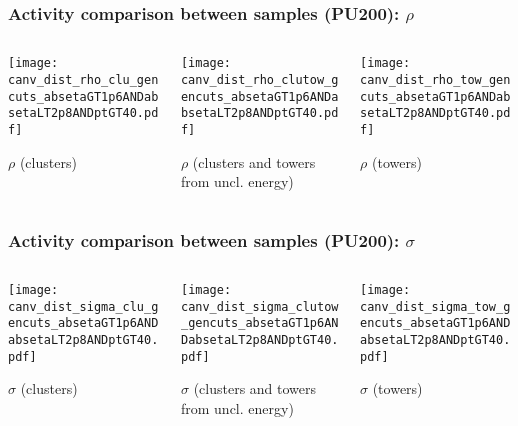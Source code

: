 \documentclass[8pt]{beamer}
\begin{document}
\begin{frame}
 \frametitle{Activity comparison between samples (PU200): $\rho$}
 
 \begin{columns}
  \begin{column}{0.4\textwidth}
   \texttt{[image: canv\_dist\_rho\_clu\_gencuts\_absetaGT1p6ANDabsetaLT2p8ANDptGT40.pdf]}
   
   $\rho$ (clusters)
  \end{column}
  \begin{column}{0.4\textwidth}
   \texttt{[image: canv\_dist\_rho\_clutow\_gencuts\_absetaGT1p6ANDabsetaLT2p8ANDptGT40.pdf]}
   
   $\rho$ (clusters and towers from uncl. energy)
  \end{column}
  \begin{column}{0.4\textwidth}
   \texttt{[image: canv\_dist\_rho\_tow\_gencuts\_absetaGT1p6ANDabsetaLT2p8ANDptGT40.pdf]}
   
   $\rho$ (towers)
  \end{column}
 \end{columns}

\end{frame}

\begin{frame}
 \frametitle{Activity comparison between samples (PU200): $\sigma$}
 
 \begin{columns}
  \begin{column}{0.4\textwidth}
   \texttt{[image: canv\_dist\_sigma\_clu\_gencuts\_absetaGT1p6ANDabsetaLT2p8ANDptGT40.pdf]}
   
   $\sigma$ (clusters)
  \end{column}
  \begin{column}{0.4\textwidth}
   \texttt{[image: canv\_dist\_sigma\_clutow\_gencuts\_absetaGT1p6ANDabsetaLT2p8ANDptGT40.pdf]}
   
   $\sigma$ (clusters and towers from uncl. energy)
  \end{column}
  \begin{column}{0.4\textwidth}
   \texttt{[image: canv\_dist\_sigma\_tow\_gencuts\_absetaGT1p6ANDabsetaLT2p8ANDptGT40.pdf]}
   
   $\sigma$ (towers)
  \end{column}
 \end{columns}

\end{frame}
\end{document}
